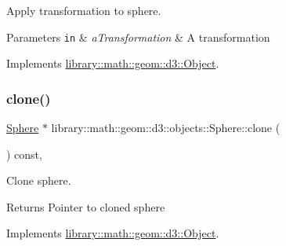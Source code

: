 Apply transformation to sphere. 


\begin{DoxyParams}[1]{Parameters}
\mbox{\tt in}  & {\em a\+Transformation} & A transformation \\
\hline
\end{DoxyParams}


Implements \hyperlink{classlibrary_1_1math_1_1geom_1_1d3_1_1_object_a5fc47b1ee5d9a28efc6010d3d1512470}{library\+::math\+::geom\+::d3\+::\+Object}.

\mbox{\label{classlibrary_1_1math_1_1geom_1_1d3_1_1objects_1_1_sphere_a58370a8ff15b7c5a48cf4ffec5be3015}} 
\subsubsection{\texorpdfstring{clone()}{clone()}}
{\footnotesize\ttfamily \hyperlink{classlibrary_1_1math_1_1geom_1_1d3_1_1objects_1_1_sphere}{Sphere} $\ast$ library\+::math\+::geom\+::d3\+::objects\+::\+Sphere\+::clone (\begin{DoxyParamCaption}{ }\end{DoxyParamCaption}) const\hspace{0.3cm}{\ttfamily [override]}, {\ttfamily [virtual]}}



Clone sphere. 

\begin{DoxyReturn}{Returns}
Pointer to cloned sphere 
\end{DoxyReturn}


Implements \hyperlink{classlibrary_1_1math_1_1geom_1_1d3_1_1_object_a1a784c6b359e0eb97cd34fabc42f2f3f}{library\+::math\+::geom\+::d3\+::\+Object}.

\mbox{\label{classlibrary_1_1math_1_1geom_1_1d3_1_1objects_1_1_sphere_a871367ab75aa46194a6b8ddc8a45967f}} 
